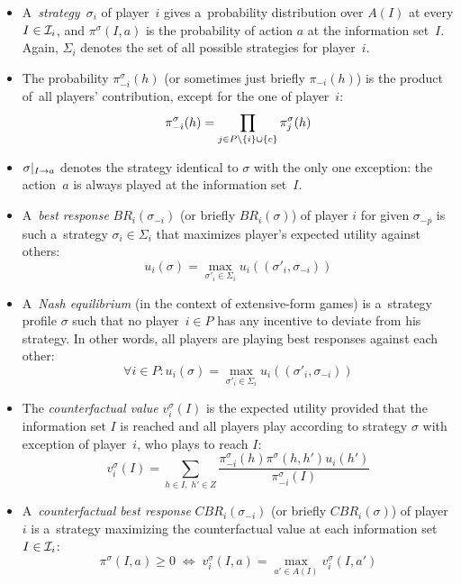 \begin{itemize}
  \item A~\emph{strategy}~$\sigma_i$ of player~$i$ gives a~probability distribution over $A(I)$ at every $I \in \mathcal{I}_i$, and $\pi ^\sigma (I, a)$ is the probability of action $a$ at the information set~$I$.
    Again, $\Sigma_i$ denotes the set of all possible strategies for player~$i$.

  \item The probability $\pi _{-i} ^\sigma (h)$ (or sometimes just briefly $\pi _{-i} (h)$) is the product of~all players' contribution, except for the one of player~$i$:
    \[\pi _{-i} ^\sigma(h) = \prod _{j \in P \setminus \left\{ i \right\} \cup \left\{ c \right\}} \pi _j ^\sigma (h)\]
    
  \item $\sigma | _{I \rightarrow a}$ denotes the strategy identical to $\sigma$ with the only one exception:
    the action~$a$ is always played at the information set~$I$.

  \item A~\emph{best response} $BR _i (\sigma _{-i})$ (or briefly $BR _i (\sigma)$) of player $i$ for given $\sigma _{-p}$ is such a~strategy $\sigma _i \in \Sigma _i$ that maximizes player's expected utility against others:
    \[ u_i (\sigma) = \max _{\sigma'_i \in \Sigma_i} u_i ((\sigma'_i, \sigma_{-i})) \]

  \item A~\emph{Nash equilibrium} (in the context of extensive-form games) is a~strategy profile $\sigma$ such that no player~$i \in P$ has any incentive to deviate from his strategy.
    In other words, all players are playing best responses against each other:
    \[ \forall i \in P\colon u_i (\sigma) = \max _{\sigma'_i \in \Sigma_i} u_i ((\sigma'_i, \sigma_{-i})) \]

  \item The \emph{counterfactual value} $v _i ^\sigma (I)$ is the expected utility provided that the information set $I$ is reached and all players play according to strategy $\sigma$ with exception of player~$i$, who plays to reach $I$:
    \[ v _i ^\sigma (I) = \sum\limits _{h \in I, \; h' \in Z}
      \frac
      {\pi _{-i} ^\sigma(h) \pi ^\sigma(h,h') u_i(h')}
      {\pi _{-i} ^\sigma (I)} \]

  \item A~\emph{counterfactual best response} $CBR _i (\sigma _{-i})$ (or briefly $CBR _i (\sigma)$) of player~$i$ is a~strategy maximizing the counterfactual value at each information set $I \in \mathcal{I} _i$:
    \[ \pi ^\sigma (I, a) \geq 0
      \; \Longleftrightarrow \;
      v _i ^\sigma (I, a) = \max _{a' \in A(I)} v _i ^\sigma (I, a') \]


\end{itemize}
